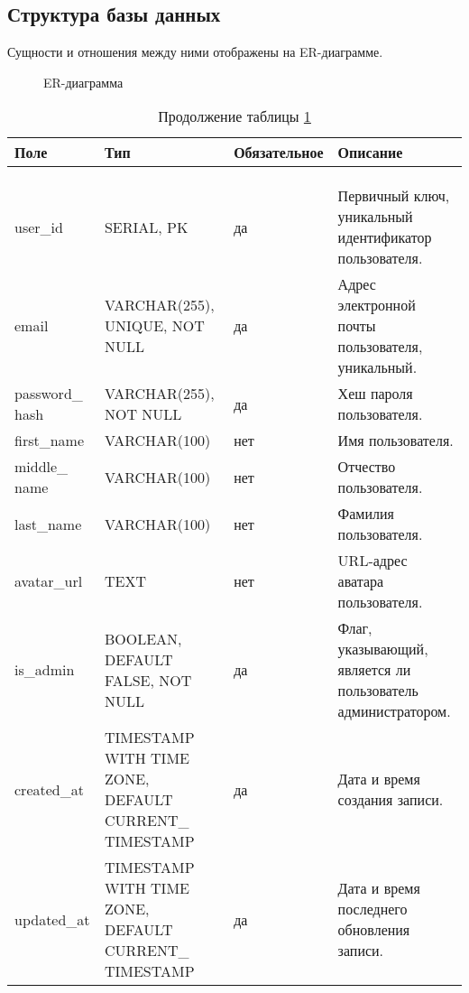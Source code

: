 \subsection{Структура базы данных}

Сущности и отношения между ними отображены на ER-диаграмме.

 \begin{figure}[ht]
	\caption{ER-диаграмма}
	\label{er_diagram:image}
\end{figure}

\begin{xltabular}{\textwidth}{|p{2.5cm}|p{4cm}|p{1.7cm}|X|}
	\caption{Атрибуты сущности «Users»\label{users:table}}\\ \hline
	\centrow Поле & \centrow Тип & \centrow Обяза\-тельное & \centrow Описание \\ \hline
	 &  &  &  \\ \hline
	\endfirsthead
	\caption*{Продолжение таблицы \ref{users:table}} \\ \hline
	 &  &  &  \\ \hline
	\finishhead
	user\_id & SERIAL, PK & \centrow да & Первичный ключ, уникальный идентификатор пользователя. \\ \hline
	email & VARCHAR(255), UNIQUE, NOT NULL & \centrow да & Адрес электронной почты пользователя, уникальный. \\ \hline
	password\_ hash & VARCHAR(255), NOT NULL & \centrow да & Хеш пароля пользователя. \\ \hline
	first\_name & VARCHAR(100) & \centrow нет & Имя пользователя. \\ \hline
	middle\_ name & VARCHAR(100) & \centrow нет & Отчество пользователя. \\ \hline
	last\_name & VARCHAR(100) & \centrow нет & Фамилия пользователя. \\ \hline
	avatar\_url & TEXT & \centrow нет & URL-адрес аватара пользователя. \\ \hline
	is\_admin & BOOLEAN, DEFAULT FALSE, NOT NULL & \centrow да & Флаг, указывающий, является ли пользователь администратором. \\ \hline
	created\_at & TIMESTAMP WITH TIME ZONE, DEFAULT CURRENT\_ TIMESTAMP & \centrow да & Дата и время создания записи. \\ \hline
	updated\_at & TIMESTAMP WITH TIME ZONE, DEFAULT CURRENT\_ TIMESTAMP & \centrow да & Дата и время последнего обновления записи. \\ \hline
\end{xltabular}

